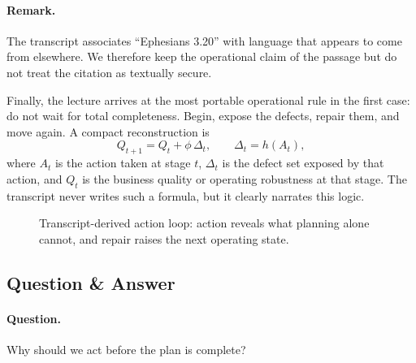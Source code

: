 \paragraph{Remark.} The transcript associates ``Ephesians 3.20'' with language that appears to come from elsewhere. We therefore keep the operational claim of the passage but do not treat the citation as textually secure.

Finally, the lecture arrives at the most portable operational rule in the first case: do not wait for total completeness. Begin, expose the defects, repair them, and move again. A compact reconstruction is
\begin{equation}
Q_{t+1} = Q_t + \phi\,\Delta_t,
\qquad
\Delta_t = h(A_t),
\end{equation}
where \(A_t\) is the action taken at stage \(t\), \(\Delta_t\) is the defect set exposed by that action, and \(Q_t\) is the business quality or operating robustness at that stage. The transcript never writes such a formula, but it clearly narrates this logic.

\begin{figure}[h]
\centering
{}
\caption{Transcript-derived action loop: action reveals what planning alone cannot, and repair raises the next operating state.}
\end{figure}

\subsection{Question \& Answer}

\paragraph{Question.} Why should we act before the plan is complete?

